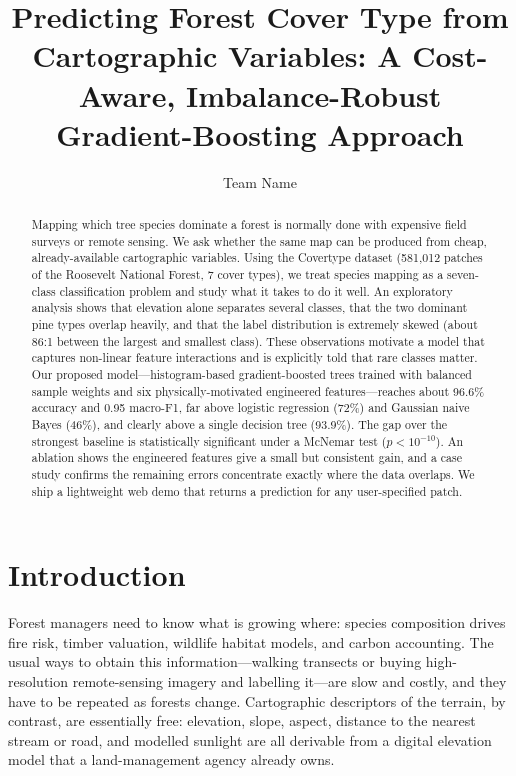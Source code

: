 \documentclass[sigconf,nonacm]{acmart}
\begin{document}
\title{Predicting Forest Cover Type from Cartographic Variables: A Cost-Aware,
Imbalance-Robust Gradient-Boosting Approach}

\author{Team Name}

\renewcommand{\shortauthors}{DSC 148 Project}

\begin{abstract}
Mapping which tree species dominate a forest is normally done with expensive
field surveys or remote sensing. We ask whether the same map can be produced
from cheap, already-available cartographic variables. Using the Covertype
dataset (581{,}012 patches of the Roosevelt National Forest, 7 cover types), we
treat species mapping as a seven-class classification problem and study what it
takes to do it well. An exploratory analysis shows that elevation alone
separates several classes, that the two dominant pine types overlap heavily,
and that the label distribution is extremely skewed (about 86:1 between the
largest and smallest class). These observations motivate a model that captures
non-linear feature interactions and is explicitly told that rare classes
matter. Our proposed model---histogram-based gradient-boosted trees trained
with balanced sample weights and six physically-motivated engineered
features---reaches about 96.6\% accuracy and 0.95 macro-F1, far above logistic
regression (72\%) and Gaussian naive Bayes (46\%), and clearly above a single
decision tree (93.9\%). The gap over the strongest baseline is statistically
significant under a McNemar test ($p<10^{-10}$). An ablation shows the
engineered features give a small but consistent gain, and a case study confirms
the remaining errors concentrate exactly where the data overlaps. We ship a
lightweight web demo that returns a prediction for any user-specified patch.
\end{abstract}


\maketitle

\section{Introduction}
Forest managers need to know what is growing where: species composition drives
fire risk, timber valuation, wildlife habitat models, and carbon accounting.
The usual ways to obtain this information---walking transects or buying
high-resolution remote-sensing imagery and labelling it---are slow and costly,
and they have to be repeated as forests change. Cartographic descriptors of the
terrain, by contrast, are essentially free: elevation, slope, aspect, distance
to the nearest stream or road, and modelled sunlight are all derivable from a
digital elevation model that a land-management agency already owns.
\end{document}
